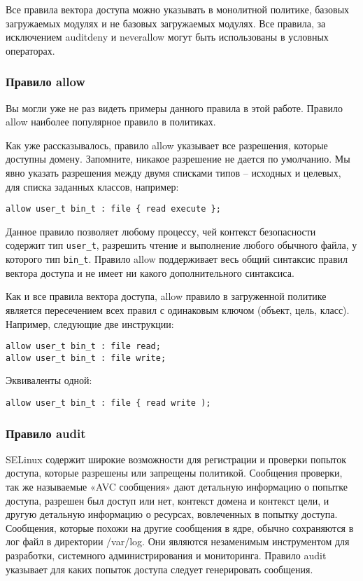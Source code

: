 \documentclass{./../class/UIR}
\begin{document}
    Все правила вектора доступа можно указывать в монолитной политике, базовых
    загружаемых модулях и не базовых загружаемых модулях. Все правила, за
    исключением auditdeny и neverallow могут быть использованы в условных
    операторах.

\subsubsection{Правило allow}

    Вы могли уже не раз видеть примеры данного правила в этой работе. Правило
    allow наиболее популярное правило в политиках.

    Как уже рассказывалось, правило allow указывает все разрешения, которые
    доступны домену. Запомните, никакое разрешение не дается по умолчанию. Мы
    явно указать разрешения между двумя списками типов – исходных и целевых, для
    списка заданных классов, например:
\begin{verbatim}
allow user_t bin_t : file { read execute };
\end{verbatim}
    Данное правило позволяет любому процессу, чей контекст безопасности
    содержит тип \verb"user_t", разрешить чтение и выполнение любого обычного
    файла, у которого тип \verb"bin_t". Правило allow поддерживает весь общий
    синтаксис правил вектора доступа и не имеет ни какого дополнительного синтаксиса.

    Как и все правила вектора доступа, allow правило в загруженной политике
    является пересечением всех правил с одинаковым ключом (объект, цель, класс).
    Например, следующие две инструкции:
\begin{verbatim}
allow user_t bin_t : file read;
allow user_t bin_t : file write;
\end{verbatim}
Эквиваленты одной:
\begin{verbatim}
allow user_t bin_t : file { read write );
\end{verbatim}
\subsubsection{Правило audit}

    SELinux содержит широкие возможности для регистрации и проверки попыток
    доступа, которые разрешены или запрещены политикой. Сообщения проверки, так
    же называемые «AVC сообщения» дают детальную информацию о попытке доступа,
    разрешен был доступ или нет, контекст домена и контекст цели, и другую
    детальную информацию о ресурсах, вовлеченных в попытку доступа. Сообщения,
    которые похожи на другие сообщения в ядре, обычно сохраняются в лог файл в
    директории /var/log. Они являются незаменимым инструментом для разработки,
    системного администрирования и мониторинга. Правило audit указывает для
    каких попыток доступа следует генерировать сообщения.
\end{document}
